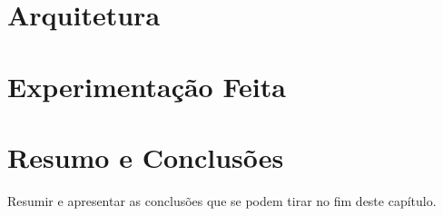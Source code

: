 
\section{Arquitetura} %
\label{sec:arquitetura}



\section{Experimentação Feita} %
\label{sec:experimentacao}


\section{Resumo e Conclusões}

Resumir e apresentar as conclusões que se podem tirar no fim deste
capítulo.
